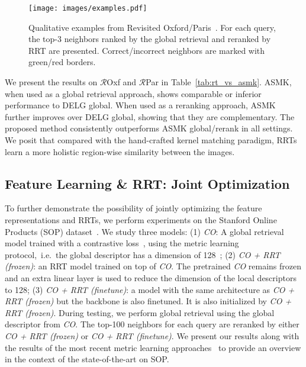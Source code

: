 \begin{figure*}[t]
  \centering
  \texttt{[image: images/examples.pdf]}
  \vspace{-0.06in}
  \caption{Qualitative examples from Revisited Oxford/Paris~\cite{revisited}. For each query, the top-3 neighbors ranked by the global retrieval and reranked by RRT are presented. Correct/incorrect neighbors are marked with {\color{green}green}/{\color{red}red} borders.
  \vspace{-0.12in}
  }
  \label{fig:qual}
\end{figure*}

We present the results on $\mathcal{R}$Oxf and $\mathcal{R}$Par in Table~\ref{tab:rt_vs_asmk}. 
ASMK, when used as a global retrieval approach, shows comparable or inferior performance to DELG global.
When used as a reranking approach, ASMK further improves over DELG global, showing that they are complementary.
The proposed method consistently outperforms ASMK global/rerank in all settings.
We posit that compared with the hand-crafted kernel matching paradigm, RRTs learn a more holistic region-wise similarity between the images.


\subsection{Feature Learning \& RRT: Joint Optimization}
To further demonstrate the possibility of jointly optimizing the feature representations and RRTs, 
we perform experiments on the Stanford Online Products (SOP) dataset~\cite{sop2016}.
We study three models: 
(1) \textit{CO}: A global retrieval model trained with a contrastive loss~\cite{XBM2020}, using the metric learning protocol,~i.e.~the global descriptor has a dimension of 128~\cite{roth2020revisiting,fastap2019,divide2019, MIC2019, XBM2020}; (2) \textit{CO + RRT (frozen)}: an RRT model trained on top of \textit{CO}. 
The pretrained \textit{CO} remains frozen and an extra linear layer is used to reduce the dimension of the local descriptors to 128; 
(3) \textit{CO + RRT (finetune)}: a model with the same architecture as \textit{CO + RRT (frozen)} but the backbone is also finetuned. 
It is also initialized by \textit{CO + RRT (frozen)}. 
During testing, we perform global retrieval using the global descriptor from \textit{CO}.
The top-100 neighbors for each query are reranked by either \textit{CO + RRT (frozen)} or \textit{CO + RRT (finetune)}.
We present our results along with the results of the most recent metric learning approaches~\cite{roth2020revisiting, fastap2019, XBM2020, CE2020} to provide an overview in the context of the state-of-the-art on SOP.

